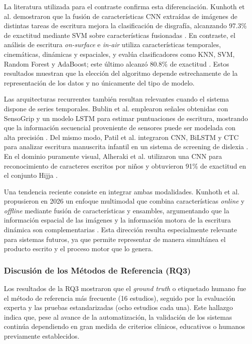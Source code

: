 \documentclass{iaesarticle}
\begin{document}
La literatura utilizada para el contraste confirma esta diferenciación.
Kunhoth et al. demostraron que la fusión de características CNN extraídas de imágenes de distintas tareas
de escritura mejora la clasificación de disgrafía, alcanzando 97.3\% de
exactitud mediante SVM sobre características fusionadas
\cite{Kunhoth2023a}. En contraste, el análisis de escritura
\textit{on-surface} e \textit{in-air} utiliza características temporales,
cinemáticas, dinámicas y espaciales, y evalúa clasificadores como KNN, SVM,
Random Forest y AdaBoost; este último alcanzó 80.8\% de exactitud
\cite{Kunhoth2023b}. Estos resultados muestran que la elección del algoritmo
depende estrechamente de la representación de los datos y no únicamente del
tipo de modelo.

Las arquitecturas recurrentes también resultan relevantes cuando el sistema
dispone de series temporales. Bublin et al. emplearon señales obtenidas con
SensoGrip y un modelo LSTM para estimar puntuaciones de escritura, mostrando
que la información secuencial proveniente de sensores puede ser modelada con
alta precisión \cite{Bublin2023}. Del mismo modo, Patil et al. integraron CNN,
BiLSTM y CTC para analizar escritura manuscrita infantil en un sistema de
screening de dislexia \cite{Patil2024}. En el dominio puramente visual,
Alheraki et al. utilizaron una CNN para reconocimiento de caracteres escritos
por niños y obtuvieron 91\% de exactitud en el conjunto Hijja
\cite{Alheraki2023}.

Una tendencia reciente consiste en integrar ambas modalidades. Kunhoth et al.
propusieron en 2026 un enfoque multimodal que combina características
\textit{online} y \textit{offline} mediante fusión de características y
ensambles, argumentando que la información espacial de las imágenes y la
información motora de la escritura dinámica son complementarias
\cite{Kunhoth2026}. Esta dirección resulta especialmente relevante para
sistemas futuros, ya que permite representar de manera simultánea el producto
escrito y el proceso motor que lo genera.

\subsubsection{Discusión de los Métodos de Referencia (RQ3)}

Los resultados de la RQ3 mostraron que el \textit{ground truth} o etiquetado
humano fue el método de referencia más frecuente (16 estudios), seguido por
la evaluación experta y las pruebas estandarizadas (ocho estudios cada una). Este hallazgo indica que, pese al avance de
la automatización, la validación de los sistemas continúa dependiendo en gran
medida de criterios clínicos, educativos o humanos previamente establecidos.
\end{document}
